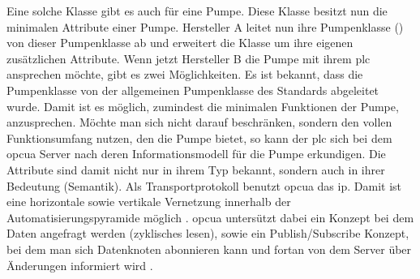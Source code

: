 Eine solche Klasse gibt es auch für eine Pumpe. Diese Klasse besitzt nun die minimalen Attribute einer Pumpe.
Hersteller A leitet nun ihre Pumpenklasse () von dieser Pumpenklasse ab und erweitert die Klasse um ihre eigenen zusätzlichen Attribute.
Wenn jetzt Hersteller B die Pumpe mit ihrem \ac{plc} ansprechen möchte, gibt es zwei Möglichkeiten.
Es ist bekannt, dass die Pumpenklasse  von der allgemeinen Pumpenklasse des Standards abgeleitet wurde.
Damit ist es möglich, zumindest die minimalen Funktionen der Pumpe, anzusprechen. 
Möchte man sich nicht darauf beschränken, sondern den vollen Funktionsumfang nutzen, den die Pumpe bietet, 
so kann der \ac{plc} sich bei dem \ac{opcua} Server nach deren Informationsmodell für die Pumpe erkundigen.
Die Attribute sind damit nicht nur in ihrem Typ bekannt, sondern auch in ihrer Bedeutung (Semantik).
Als Transportprotokoll benutzt \ac{opcua} das \ac{ip}. 
Damit ist eine horizontale sowie vertikale Vernetzung innerhalb der Automatisierungspyramide möglich \citep{opcua:2018}.
\ac{opcua} untersützt dabei ein Konzept bei dem Daten angefragt werden (zyklisches lesen), sowie ein Publish/Subscribe Konzept, 
bei dem man sich Datenknoten abonnieren kann und fortan von dem Server über Änderungen informiert wird \citep{opcua:2018}.

